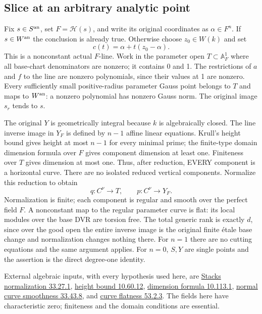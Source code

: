 \documentclass[
  10pt,
]{article}
\begin{document}
\subsection{Slice at an arbitrary analytic
point}\label{slice-at-an-arbitrary-analytic-point}

Fix \(s\in S^{\rm an}\), set \(F=\mathcal H(s)\), and write its original
coordinates as \(\alpha\in F^n\). If \(s\in W^{\rm an}\) the conclusion
is already true. Otherwise choose \(z_0\in W(k)\) and set \[
 c(t)=\alpha+t(z_0-\alpha).
\] This is a nonconstant actual \(F\)-line. Work in the parameter open
\(T\subset\mathbb A_F^1\) where all base-chart denominators are nonzero;
it contains 0 and 1. The restrictions of \(a\) and \(f\) to the line are
nonzero polynomials, since their values at 1 are nonzero. Every
sufficiently small positive-radius parameter Gauss point belongs to
\(T\) and maps to \(W^{\rm an}\): a nonzero polynomial has nonzero Gauss
norm. The original image \(s_r\) tends to \(s\).

The original \(Y\) is geometrically integral because \(k\) is
algebraically closed. The line inverse image in \(Y_F\) is defined by
\(n-1\) affine linear equations. Krull's height bound gives height at
most \(n-1\) for every minimal prime; the finite-type domain dimension
formula over \(F\) gives component dimension at least one. Finiteness
over \(T\) gives dimension at most one. Thus, after reduction, EVERY
component is a horizontal curve. There are no isolated reduced vertical
components. Normalize this reduction to obtain \[
 q:C^\nu\longrightarrow T,\qquad p:C^\nu\longrightarrow Y_F.
\] Normalization is finite; each component is regular and smooth over
the perfect field \(F\). A nonconstant map to the regular parameter
curve is flat: its local modules over the base DVR are torsion free. The
total generic rank is exactly \(d\), since over the good open the entire
inverse image is the original finite étale base change and normalization
changes nothing there. For \(n=1\) there are no cutting equations and
the same argument applies. For \(n=0\), \(S,Y\) are single points and
the assertion is the direct degree-one identity.

External algebraic inputs, with every hypothesis used here, are
\href{https://stacks.math.columbia.edu/tag/0BXQ}{Stacks normalization
33.27.1}, \href{https://stacks.math.columbia.edu/tag/0BBZ}{height bound
10.60.12}, \href{https://stacks.math.columbia.edu/tag/02IJ}{dimension
formula 10.113.1},
\href{https://stacks.math.columbia.edu/tag/0B8Y}{normal curve smoothness
33.43.8}, and \href{https://stacks.math.columbia.edu/tag/0BXX}{curve
flatness 53.2.3}. The fields here have characteristic zero; finiteness
and the domain conditions are essential.
\end{document}
